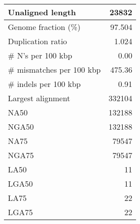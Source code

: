 \documentclass[12pt,a4paper]{article}
\begin{document}
\begin{table}[ht]
\begin{center}
\begin{tabular}{|l*{1}{|r}|}
Unaligned length & 23832 \\ \hline
Genome fraction (\%) & 97.504 \\ \hline
Duplication ratio & 1.024 \\ \hline
\# N's per 100 kbp & 0.00 \\ \hline
\# mismatches per 100 kbp & 475.36 \\ \hline
\# indels per 100 kbp & 0.91 \\ \hline
Largest alignment & 332104 \\ \hline
NA50 & 132188 \\ \hline
NGA50 & 132188 \\ \hline
NA75 & 79547 \\ \hline
NGA75 & 79547 \\ \hline
LA50 & 11 \\ \hline
LGA50 & 11 \\ \hline
LA75 & 22 \\ \hline
LGA75 & 22 \\ \hline
\end{tabular}
\end{center}
\end{table}
\end{document}
